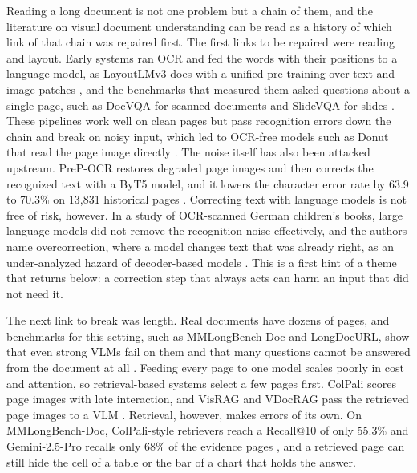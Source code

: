 \documentclass[conference]{IEEEtran}
\begin{document}
Reading a long document is not one problem but a chain of them, and the literature on visual document understanding can be read as a history of which link of that chain was repaired first. The first links to be repaired were reading and layout. Early systems ran OCR and fed the words with their positions to a language model, as LayoutLMv3 does with a unified pre-training over text and image patches \cite{huang2022layoutlmv3}, and the benchmarks that measured them asked questions about a single page, such as DocVQA for scanned documents and SlideVQA for slides \cite{mathew2021docvqa,tanaka2023slidevqa}. These pipelines work well on clean pages but pass recognition errors down the chain and break on noisy input, which led to OCR-free models such as Donut that read the page image directly \cite{kim2022donut}. The noise itself has also been attacked upstream. PreP-OCR restores degraded page images and then corrects the recognized text with a ByT5 model, and it lowers the character error rate by 63.9 to 70.3\% on 13,831 historical pages \cite{guan2025preocr}. Correcting text with language models is not free of risk, however. In a study of OCR-scanned German children's books, large language models did not remove the recognition noise effectively, and the authors name overcorrection, where a model changes text that was already right, as an under-analyzed hazard of decoder-based models \cite{nguyen2025gec}. This is a first hint of a theme that returns below: a correction step that always acts can harm an input that did not need it.

The next link to break was length. Real documents have dozens of pages, and benchmarks for this setting, such as MMLongBench-Doc and LongDocURL, show that even strong VLMs fail on them and that many questions cannot be answered from the document at all \cite{ma2024mmlongbench,deng2025longdocurl}. Feeding every page to one model scales poorly in cost and attention, so retrieval-based systems select a few pages first. ColPali scores page images with late interaction, and VisRAG and VDocRAG pass the retrieved page images to a VLM \cite{faysse2024colpali,yu2024visrag,tanaka2025vdocrag}. Retrieval, however, makes errors of its own. On MMLongBench-Doc, ColPali-style retrievers reach a Recall@10 of only 55.3\% and Gemini-2.5-Pro recalls only 68\% of the evidence pages \cite{zhu2025doclens}, and a retrieved page can still hide the cell of a table or the bar of a chart that holds the answer.
\end{document}
